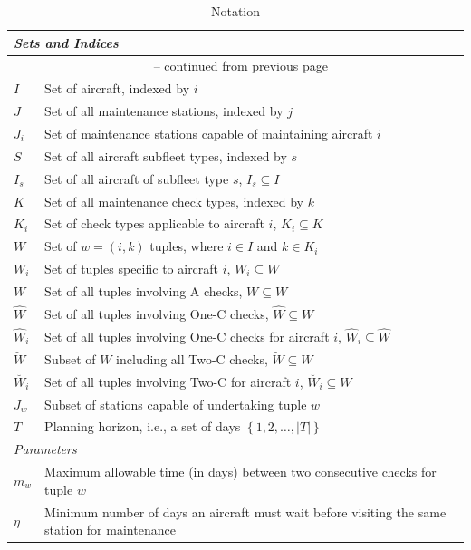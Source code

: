 \begingroup
{} %
\begin{longtable}{l p{16cm}}
\caption{Notation}
\label{tab:notation_tab} \\
\hline
\multicolumn{2}{l}{\textit{Sets and Indices}} \\ \hline
\endfirsthead
\multicolumn{2}{c}{{\tablename\ \thetable{} -- continued from previous page}} \\
\hline
\endhead
\endfoot
\hline
\endlastfoot
$I$ & Set of aircraft, indexed by $i$ \\
$J$ & Set of all maintenance stations, indexed by $j$ \\
$J_i$ & Set of maintenance stations capable of maintaining aircraft $i$ \\
$S$ & Set of all aircraft subfleet types, indexed by $s$ \\
$I_s$ & Set of all aircraft of subfleet type $s$, $I_s \subseteq I$ \\
$K$ & Set of all maintenance check types, indexed by $k$ \\
$K_i$ & Set of check types applicable to aircraft $i$, $K_i \subseteq K$ \\
$W$ & Set of $w = (i,k)$ tuples, where $i \in I$ and $k \in K_i$ \\
$W_i$ & Set of tuples specific to aircraft $i$, $W_i \subseteq W$ \\
$\bar{W}$ & Set of all tuples involving A checks, $\bar{W} \subseteq W$  \\
$\hat{W}$ & Set of all tuples involving One-C checks, $\hat{W} \subseteq W$ \\
$\hat{W}_i$ & Set of all tuples involving One-C checks for aircraft $i$, $\hat{W}_i \subseteq \hat{W} $\\
$\breve{W}$ & Subset of $W$ including all Two-C checks, $\breve{W} \subseteq W$ \\
$\breve{W_i}$ &  Set of all tuples involving Two-C for aircraft $i$, $\breve{W_i} \subseteq W$  \\
$J_w$ & Subset of stations capable of undertaking tuple $w$\\
$T$ & Planning horizon, i.e., a set of days $\left\{1,2,\dots,|T|\right\}$ \\
\hline
\multicolumn{2}{l}{\textit{Parameters}} \\ \hline
$m_w$ & Maximum allowable time (in days) between two consecutive checks for tuple $w$ \\
$\eta$ & Minimum number of days an aircraft must wait before visiting the same station for maintenance \\

\end{longtable}
